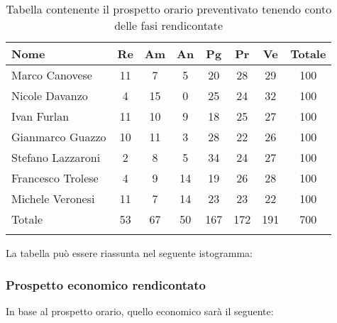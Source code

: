 			\begin{longtable}{|l|c|c|c|c|c|c|c|}
				\hline
				\rowcolor{lighter-grayer}
				\textbf{Nome} & \textbf{Re} & \textbf{Am} & \textbf{An} & \textbf{Pg}  & \textbf{Pr}   & \textbf{Ve} & \textbf{Totale} \\
				\hline
				\endfirsthead
				
				\hline
				Marco Canovese & 11 & 7 & 5 & 20 & 28 & 29 & 100\\
				\hline
				\hline
				Nicole Davanzo & 4 & 15 & 0 & 25 & 24 & 32 & 100\\
				\hline
				\hline
				Ivan Furlan & 11 & 10 & 9 & 18 & 25 & 27 & 100\\
				\hline
				\hline
				Gianmarco Guazzo & 10 & 11 & 3 & 28 & 22 & 26 & 100\\
				\hline
				\hline
				Stefano Lazzaroni & 2 & 8 & 5 & 34 & 24 & 27 & 100\\
				\hline
				\hline
				Francesco Trolese & 4 & 9 & 14 & 19 & 26 & 28 & 100\\
				\hline
				\hline
				Michele Veronesi & 11 & 7 & 14 & 23 & 23 & 22 & 100\\
				\hline 
				\hline
				Totale & 53 & 67 & 50 & 167 & 172 & 191 & 700\\
				\hline 
				\caption{Tabella contenente il prospetto orario preventivato tenendo conto delle fasi rendicontate}
			\end{longtable}

		
			La tabella può essere riassunta nel seguente istogramma:
		
		
			\subsubsection{Prospetto economico rendicontato}
			In base al prospetto orario, quello economico sarà il seguente: 
			
